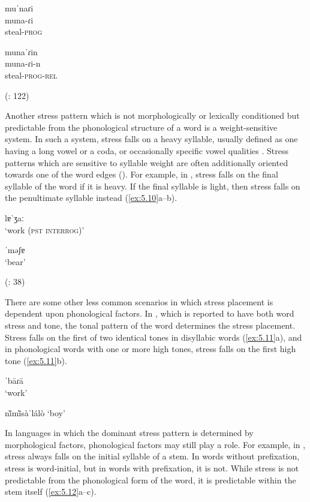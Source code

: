 \ex  muˈnaɾi\\
  muna-ɾi\\
steal-\textsc{prog}

\ex  munaˈɾin\\
  muna-ɾi-n\\
steal-\textsc{prog}-\textsc{rel}

(\citealt{VallejosYopán2010}: 122)
\z
\z

  Another stress pattern which is not morphologically or lexically conditioned but predictable from the phonological structure of a word is a weight-sensitive system. In such a system, stress falls on a heavy syllable, usually defined as one having a long vowel or a coda, or occasionally specific vowel qualities \citep{Gordon2006}. Stress patterns which are sensitive to syllable weight are often additionally oriented towards one of the word edges (\citealt{GoedemansvanderHulst2013b}). For example, in , stress falls on the final syllable of the word if it is heavy. If the final syllable is light, then stress falls on the penultimate syllable instead (\ref{ex:5.10}a--b).

\ea\label{ex:5.10}

\ea   lɐˈʒaː\\
\glt ‘work (\textsc{pst} \textsc{interrog})’

\ex  ˈməʃɐ\\
\glt ‘bear’

(\citealt{GordonApplebaum2010}: 38)
\z
\z

  There are some other less common scenarios in which stress placement is dependent upon phonological factors. In , which is reported to have both word stress and tone, the tonal pattern of the word determines the stress placement. Stress falls on the first of two identical tones in disyllabic words (\ref{ex:5.11}a), and in phonological words with one or more high tones, stress falls on the first high tone (\ref{ex:5.11}b).

\ea\label{ex:5.11}
\ea  ˈbāɾā\\
\glt ‘work’

\ex  n\`{ĩ}m\`{ĩ}sàˈlálò
\glt ‘boy’
\citep[110]{Morse1976}
\z
\z

  In languages in which the dominant stress pattern is determined by morphological factors, phonological factors may still play a role. For example, in , stress always falls on the initial syllable of a stem. In words without prefixation, stress is word-initial, but in words with prefixation, it is not. While stress is not predictable from the phonological form of the word, it is predictable within the stem itself (\ref{ex:5.12}a--c).

